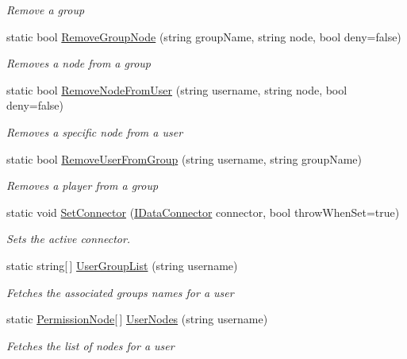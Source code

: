 \begin{DoxyCompactItemize}
\begin{DoxyCompactList}\small\item\em Remove a group \end{DoxyCompactList}\item 
static bool \hyperlink{classOTA_1_1Data_1_1Storage_a2d7fd528da26fed902f6e4bb828ff04a}{Remove\+Group\+Node} (string group\+Name, string node, bool deny=false)
\begin{DoxyCompactList}\small\item\em Removes a node from a group \end{DoxyCompactList}\item 
static bool \hyperlink{classOTA_1_1Data_1_1Storage_a4b6e956e8f38a1ebe7bfdd7024ff64f2}{Remove\+Node\+From\+User} (string username, string node, bool deny=false)
\begin{DoxyCompactList}\small\item\em Removes a specific node from a user \end{DoxyCompactList}\item 
static bool \hyperlink{classOTA_1_1Data_1_1Storage_a3861f7c907c29945bb087e30cc134152}{Remove\+User\+From\+Group} (string username, string group\+Name)
\begin{DoxyCompactList}\small\item\em Removes a player from a group \end{DoxyCompactList}\item 
static void \hyperlink{classOTA_1_1Data_1_1Storage_ac1460ae900de87508e0c5b83d8e71e52}{Set\+Connector} (\hyperlink{interfaceOTA_1_1Data_1_1IDataConnector}{I\+Data\+Connector} connector, bool throw\+When\+Set=true)
\begin{DoxyCompactList}\small\item\em Sets the active connector. \end{DoxyCompactList}\item 
static string\mbox{[}$\,$\mbox{]} \hyperlink{classOTA_1_1Data_1_1Storage_a7a3ad1e8b9e81464bd483cd5877e6b64}{User\+Group\+List} (string username)
\begin{DoxyCompactList}\small\item\em Fetches the associated groups names for a user \end{DoxyCompactList}\item 
static \hyperlink{structOTA_1_1Data_1_1PermissionNode}{Permission\+Node}\mbox{[}$\,$\mbox{]} \hyperlink{classOTA_1_1Data_1_1Storage_abef11a9c3944a2b4dc6e2b724673e5f9}{User\+Nodes} (string username)
\begin{DoxyCompactList}\small\item\em Fetches the list of nodes for a user \end{DoxyCompactList}\end{DoxyCompactItemize}
